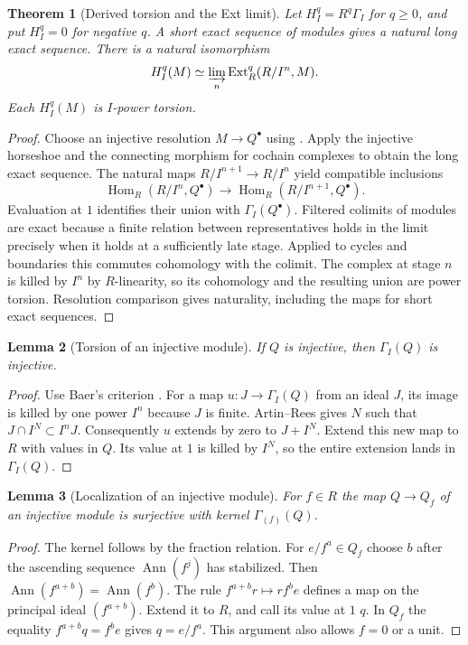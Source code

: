 \documentclass[11pt,oneside,openany]{book}
\newtheorem{theorem}{Theorem}[chapter]
\newtheorem{lemma}[theorem]{Lemma}
\theoremstyle{definition}
\theoremstyle{remark}
\begin{document}
\begin{theorem}[Derived torsion and the Ext limit]\label{res:L02}
Let \(H_I^q=R^q\Gamma_I\) for \(q\geq0\), and put \(H_I^q=0\) for
negative \(q\). A short exact sequence of modules gives a natural long
exact sequence. There is a natural isomorphism
\[
 H_I^q(M)\simeq\varinjlim_{n}\operatorname{Ext}_R^q(R/I^n,M).
\]
Each \(H_I^q(M)\) is \(I\)-power torsion.
\end{theorem}
\begin{proof}
Choose an injective resolution \(M\to Q^\bullet\) using
\cite[ALG-03-C02-S03]{p103}. Apply the injective horseshoe and the
connecting morphism for cochain complexes to obtain the long exact
sequence. The natural maps \(R/I^{n+1}\to R/I^n\) yield compatible
inclusions
\[
 \operatorname{Hom}_R(R/I^n,Q^\bullet)
   \longrightarrow \operatorname{Hom}_R(R/I^{n+1},Q^\bullet).
\]
Evaluation at \(1\) identifies their union with \(\Gamma_I(Q^\bullet)\).
Filtered colimits of modules are exact because a finite relation between
representatives holds in the limit precisely when it holds at a sufficiently
late stage. Applied to cycles and boundaries this commutes cohomology
with the colimit. The complex at stage \(n\) is killed by \(I^n\) by
\(R\)-linearity, so its cohomology and the resulting union are power
torsion. Resolution comparison gives naturality, including the maps
for short exact sequences.
\end{proof}

\begin{lemma}[Torsion of an injective module]\label{res:L03}
If \(Q\) is injective, then \(\Gamma_I(Q)\) is injective.
\end{lemma}
\begin{proof}
Use Baer's criterion \cite[ALG-03-C02-R03]{p103}. For a map
\(u:J\to\Gamma_I(Q)\) from an ideal \(J\), its image is killed by one
power \(I^n\) because \(J\) is finite. Artin--Rees
\cite[ALG-05-C04-R02]{p103} gives \(N\) such that
\(J\cap I^N\subset I^nJ\). Consequently \(u\) extends by zero to
\(J+I^N\). Extend this new map to \(R\) with values in \(Q\).
Its value at \(1\) is killed by \(I^N\), so the entire extension lands
in \(\Gamma_I(Q)\).
\end{proof}

\begin{lemma}[Localization of an injective module]\label{res:L04}
For \(f\in R\) the map \(Q\to Q_f\) of an injective module is surjective
with kernel \(\Gamma_{(f)}(Q)\).
\end{lemma}
\begin{proof}
The kernel follows by the fraction relation. For \(e/f^a\in Q_f\) choose
\(b\) after the ascending sequence \(\operatorname{Ann}(f^j)\) has
stabilized. Then \(\operatorname{Ann}(f^{a+b})=\operatorname{Ann}(f^b)\).
The rule \(f^{a+b}r\mapsto rf^b e\) defines a map on the principal ideal
\((f^{a+b})\). Extend it to \(R\), and call its value at \(1\) \(q\).
In \(Q_f\) the equality \(f^{a+b}q=f^b e\) gives \(q=e/f^a\).
This argument also allows \(f=0\) or a unit.
\end{proof}
\end{document}
